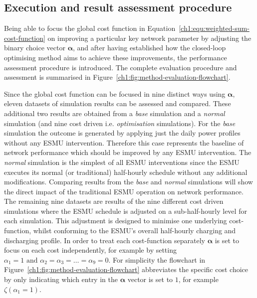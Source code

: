 

\subsection{Execution and result assessment procedure}
\label{ch1:subsec:method-execution}

Being able to focus the global cost function in Equation~\ref{ch1:equ:weighted-sum-cost-function} on improving a particular key network parameter by adjusting the binary choice vector $\boldsymbol{\alpha}$, and after having established how the closed-loop optimising method aims to achieve these improvements, the performance assessment procedure is introduced.
The complete evaluation procedure and assessment is summarised in Figure~\ref{ch1:fig:method-evaluation-flowchart}.



Since the global cost function can be focused in nine distinct ways using $\boldsymbol{\alpha}$, eleven datasets of simulation results can be assessed and compared.
These additional two results are obtained from a \textit{base} simulation and a \textit{normal} simulation (and nine cost driven i.e. \textit{optimisation} simulations).
For the \textit{base} simulation the outcome is generated by applying just the daily power profiles without any ESMU intervention.
Therefore this case represents the baseline of network performance which should be improved by any ESMU intervention.
The \textit{normal} simulation is the simplest of all ESMU interventions since the ESMU executes its normal (or traditional) half-hourly schedule without any additional modifications.
Comparing results from the \textit{base} and \textit{normal} simulations will show the direct impact of the traditional ESMU operation on network performance.
The remaining nine datasets are results of the nine different cost driven simulations where the ESMU schedule is adjusted on a sub-half-hourly level for each simulation.
This adjustment is designed to minimise one underlying cost-function, whilst conforming to the ESMU's overall half-hourly charging and discharging profile.
In order to treat each cost-function separately $\boldsymbol{\alpha}$ is set to focus on each cost independently, for example by setting $\alpha_1 = 1 \text{ and } \alpha_2 = \alpha_3 = \dots = \alpha_9 = 0$.
For simplicity the flowchart in Figure~\ref{ch1:fig:method-evaluation-flowchart} abbreviates the specific cost choice by only indicating which entry in the $\boldsymbol{\alpha}$ vector is set to $1$, for example $\zeta(\alpha_1=1)$.

